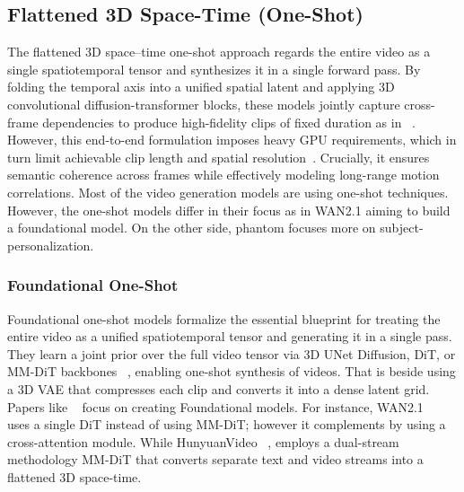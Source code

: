 \subsection{Flattened 3D Space-Time (One-Shot)}
\label{sec:arch-one-shot}
The flattened 3D space–time one-shot approach regards the entire video as a single spatiotemporal tensor and synthesizes it in a single forward pass. By folding the temporal axis into a unified spatial latent and applying 3D convolutional diffusion-transformer blocks, these models jointly capture cross-frame dependencies to produce high-fidelity clips of fixed duration as in ~\cite{ho2022vdm, yu2023magvitv2}. However, this end-to-end formulation imposes heavy GPU requirements, which in turn limit achievable clip length and spatial resolution~\cite{wan2025}. Crucially, it ensures semantic coherence across frames while effectively modeling long-range motion correlations. Most of the video generation models are using one-shot techniques. However, the one-shot models differ in their focus as in WAN2.1 \cite{wan2025} aiming to build a foundational model. On the other side, phantom \cite{liu2025phantom} focuses more on subject-personalization. 
\subsubsection{Foundational One-Shot}
\label{sec:arch-found}
Foundational one-shot models formalize the essential blueprint for treating the entire video as a unified spatiotemporal tensor and generating it in a single pass. They learn a joint prior over the full video tensor via 3D UNet Diffusion, DiT, or MM-DiT backbones ~\cite{unet2015, dit2023, flowmatching2023, flowmatching2024}, enabling one-shot synthesis of videos. That is beside using a 3D VAE that compresses each clip and converts it into a dense latent grid. Papers like ~\cite{kong2024hunyuanvideo, wan2025, peng2025opensora2, vace2025, yu2023magvitv2, bartal2024lumiere, ho2022vdm} focus on creating Foundational models. For instance, WAN2.1 ~\cite{wan2025} uses a single DiT instead of using MM-DiT; however it complements by using a cross-attention module. While HunyuanVideo ~\cite{kong2024hunyuanvideo}, employs a dual-stream methodology MM-DiT that converts separate text and video streams into a flattened 3D space-time. 
